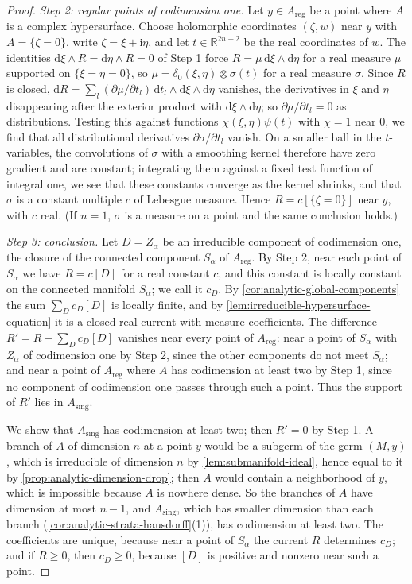 \begin{proof}
\emph{Step 2: regular points of codimension one.} Let $y\in A_{\mathrm{reg}}$ be a point where $A$ is a complex hypersurface. Choose holomorphic coordinates $(\zeta,w)$ near $y$ with $A=\{\zeta=0\}$, write $\zeta=\xi+\mathrm i\eta$, and let $t\in\mathbb R^{2n-2}$ be the real coordinates of $w$. The identities $\mathrm d\xi\wedge R=\mathrm d\eta\wedge R=0$ of Step 1 force $R=\mu\,\mathrm d\xi\wedge\mathrm d\eta$ for a real measure $\mu$ supported on $\{\xi=\eta=0\}$, so $\mu=\delta_0(\xi,\eta)\otimes\sigma(t)$ for a real measure $\sigma$. Since $R$ is closed, $\mathrm dR=\sum_l(\partial\mu/\partial t_l)\,\mathrm dt_l\wedge\mathrm d\xi\wedge\mathrm d\eta$ vanishes, the derivatives in $\xi$ and $\eta$ disappearing after the exterior product with $\mathrm d\xi\wedge\mathrm d\eta$; so $\partial\mu/\partial t_l=0$ as distributions. Testing this against functions $\chi(\xi,\eta)\psi(t)$ with $\chi=1$ near $0$, we find that all distributional derivatives $\partial\sigma/\partial t_l$ vanish. On a smaller ball in the $t$-variables, the convolutions of $\sigma$ with a smoothing kernel therefore have zero gradient and are constant; integrating them against a fixed test function of integral one, we see that these constants converge as the kernel shrinks, and that $\sigma$ is a constant multiple $c$ of Lebesgue measure. Hence $R=c[\{\zeta=0\}]$ near $y$, with $c$ real. (If $n=1$, $\sigma$ is a measure on a point and the same conclusion holds.)

\emph{Step 3: conclusion.} Let $D=Z_\alpha$ be an irreducible component of codimension one, the closure of the connected component $S_\alpha$ of $A_{\mathrm{reg}}$. By Step 2, near each point of $S_\alpha$ we have $R=c[D]$ for a real constant $c$, and this constant is locally constant on the connected manifold $S_\alpha$; we call it $c_D$. By \cref{cor:analytic-global-components} the sum $\sum_Dc_D[D]$ is locally finite, and by \cref{lem:irreducible-hypersurface-equation} it is a closed real current with measure coefficients. The difference $R'=R-\sum_Dc_D[D]$ vanishes near every point of $A_{\mathrm{reg}}$: near a point of $S_\alpha$ with $Z_\alpha$ of codimension one by Step 2, since the other components do not meet $S_\alpha$; and near a point of $A_{\mathrm{reg}}$ where $A$ has codimension at least two by Step 1, since no component of codimension one passes through such a point. Thus the support of $R'$ lies in $A_{\mathrm{sing}}$.

We show that $A_{\mathrm{sing}}$ has codimension at least two; then $R'=0$ by Step 1. A branch of $A$ of dimension $n$ at a point $y$ would be a subgerm of the germ $(M,y)$, which is irreducible of dimension $n$ by \cref{lem:submanifold-ideal}, hence equal to it by \cref{prop:analytic-dimension-drop}; then $A$ would contain a neighborhood of $y$, which is impossible because $A$ is nowhere dense. So the branches of $A$ have dimension at most $n-1$, and $A_{\mathrm{sing}}$, which has smaller dimension than each branch (\cref{cor:analytic-strata-hausdorff}(1)), has codimension at least two. The coefficients are unique, because near a point of $S_\alpha$ the current $R$ determines $c_D$; and if $R\geq0$, then $c_D\geq0$, because $[D]$ is positive and nonzero near such a point.
\end{proof}
